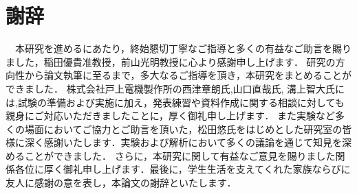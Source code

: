 \documentclass[dvipdfmx,report,uplatex]{jsbook}
\numberwithin{equation}{section}
\numberwithin{figure}{section}
\numberwithin{table}{section}
\begin{document}
\chapter*{謝辞}
　本研究を進めるにあたり，終始懇切丁寧なご指導と多くの有益なご助言を賜りました，稲田優貴准教授，前山光明教授に心より感謝申し上げます．
研究の方向性から論文執筆に至るまで，多大なるご指導を頂き，本研究をまとめることができました．
株式会社戸上電機製作所の西津章朗氏,山口直哉氏, 溝上智大氏には,試験の準備および実施に加え，発表練習や資料作成に関する相談に対しても親身にご対応いただきましたことに，厚く御礼申し上げます．
また実験など多くの場面においてご協力とご助言を頂いた，松田悠氏をはじめとした研究室の皆様に深く感謝いたします．実験および解析において多くの議論を通じて知見を深めることができました．
さらに，本研究に関して有益なご意見を賜りました関係各位に厚く御礼申し上げます．最後に，学生生活を支えてくれた家族ならびに友人に感謝の意を表し，本論文の謝辞といたします．
\clearpage




\end{document}
